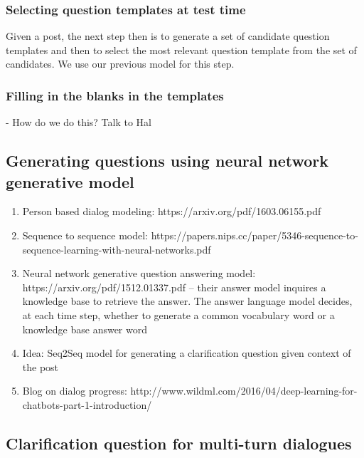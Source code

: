 \documentclass[11pt]{article}
\begin{document}
\subsubsection{Selecting question templates at test time}

Given a post, the next step then is to generate a set of candidate question templates and then to select the most relevant question template from the set of candidates. We use our previous model for this step.

\subsubsection{Filling in the blanks in the templates}

- How do we do this? Talk to Hal

\subsection{Generating questions using neural network generative model}

\begin{enumerate}
\item Person based dialog modeling: https://arxiv.org/pdf/1603.06155.pdf
\item Sequence to sequence model: https://papers.nips.cc/paper/5346-sequence-to-sequence-learning-with-neural-networks.pdf
\item Neural network generative question answering model: https://arxiv.org/pdf/1512.01337.pdf  -- their answer model inquires a knowledge base to retrieve the answer. The answer language model decides, at each time step, whether to generate a common vocabulary word or a knowledge base answer word
\item Idea: Seq2Seq model for generating a clarification question given context of the post
\item Blog on dialog progress: http://www.wildml.com/2016/04/deep-learning-for-chatbots-part-1-introduction/  
\end{enumerate}

\subsection{Clarification question for multi-turn dialogues}
\end{document}
